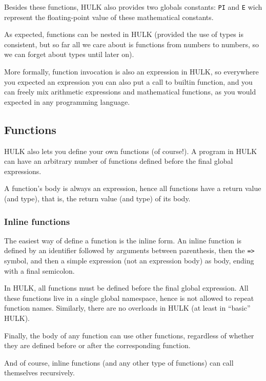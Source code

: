 \documentclass[a4paper, 12pt]{report}
\begin{document}
Besides these functions, HULK also provides two globals constants: {\tt PI} and {\tt E} wich represent
the floating-point value of these mathematical constants.

As expected, functions can be nested in HULK (provided the use of types is consistent, but so far all we
care about is functions from numbers to numbers, so we can forget about types until later on).

More formally, function invocation is also an expression in HULK, so everywhere you expected an expression
you can also put a call to builtin function, and you can freely mix arithmetic expressions and mathematical
functions, as you would expected in any programming language.

\subsection*{Functions}

HULK also lets you define your own functions (of course!). A program in HULK can have an arbitrary number of functions
defined before the final global expressions.

A function's body is always an expression, hence all functions have a return value (and type), that is, the return
value (and type) of its body.

\subsubsection*{Inline functions}

The easiest way of define a function is the inline form. An inline function is defined by
an identifier followed by arguments between parenthesis, then the {\tt =>} symbol, and then a simple expression
(not an expression body) as body, ending with a final semicolon.

In HULK, all functions must be defined before the final global expression. All these functions live in a single
global namespace, hence is not allowed to repeat function names. Similarly, there are no overloads in HULK (at least in ``basic'' HULK).

Finally, the body of any function can use other functions, regardless of whether they are defined before or after the corresponding function.

And of course, inline functions (and any other type of functions) can call themselves recursively.
\end{document}
